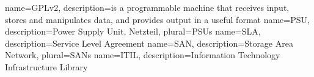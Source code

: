 	{
 	 name=GPLv2,
 	 description={is a programmable machine that receives input,
               stores and manipulates data, and provides
               output in a useful format}
	}
	{
	name=PSU,
	description={Power Supply Unit, Netzteil},
	plural=PSUs
	}
	{
	name=SLA,
	description={Service Level Agreement}
	}
	{
	name=SAN,
	description={Storage Area Network},
	plural=SANs
	}
	{
	name=ITIL,
	description={Information Technology Infrastructure Library}
	}

